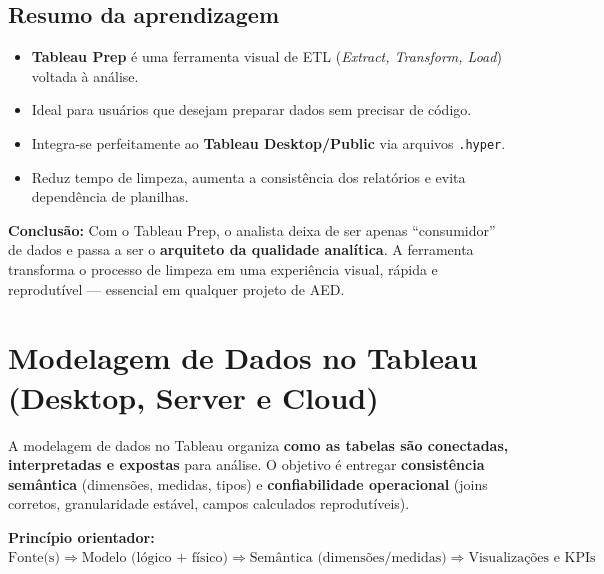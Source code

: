 \subsection*{Resumo da aprendizagem}

\begin{itemize}[leftmargin=*]
  \item \textbf{Tableau Prep} é uma ferramenta visual de ETL (\textit{Extract, Transform, Load}) voltada à análise.  
  \item Ideal para usuários que desejam preparar dados sem precisar de código.  
  \item Integra-se perfeitamente ao \textbf{Tableau Desktop/Public} via arquivos \texttt{.hyper}.  
  \item Reduz tempo de limpeza, aumenta a consistência dos relatórios e evita dependência de planilhas.  
\end{itemize}

\begin{NoteBox}
\textbf{Conclusão:}  
Com o Tableau Prep, o analista deixa de ser apenas “consumidor” de dados e passa a ser o \textbf{arquiteto da qualidade analítica}.  
A ferramenta transforma o processo de limpeza em uma experiência visual, rápida e reprodutível — essencial em qualquer projeto de AED.
\end{NoteBox}


\section{Modelagem de Dados no Tableau (Desktop, Server e Cloud)}

A modelagem de dados no Tableau organiza \textbf{como as tabelas são conectadas, interpretadas e expostas} para análise.  
O objetivo é entregar \textbf{consistência semântica} (dimensões, medidas, tipos) e \textbf{confiabilidade operacional} (joins corretos, granularidade estável, campos calculados reprodutíveis).

\begin{FormulaBox}
\textbf{Princípio orientador:}\\[3pt]
\(\text{Fonte(s)} \Rightarrow \text{Modelo (lógico + físico)} \Rightarrow \text{Semântica (dimensões/medidas)} \Rightarrow \text{Visualizações e KPIs}\)
\end{FormulaBox}

